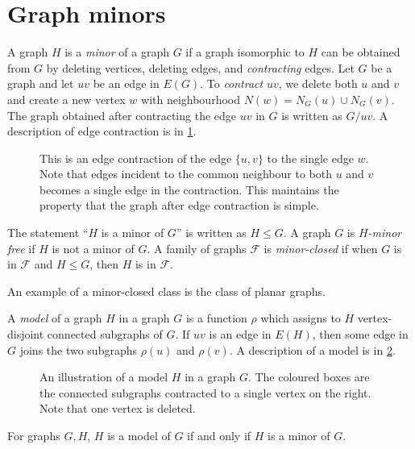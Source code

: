 \section{Graph minors}
A graph \(H\) is a \textit{minor} of a graph \(G\) if a graph isomorphic to \(H\) can be obtained from \(G\) by deleting vertices, deleting edges, and \textit{contracting} edges. Let $G$ be a graph and let $uv$ be an edge in $E(G)$. To \textit{contract} \(uv\), we delete both \(u\) and \(v\) and create a new vertex \(w\) with neighbourhood \(N(w) = N_G(u) \cup N_G(v)\). The graph obtained after contracting the edge \(uv\) in $G$ is written as \(G/uv\).
A description of edge contraction is in \cref{fig:edge_contraction}.
\begin{figure}[h!]
	\centering
	
	\caption[Edge contraction]{This is an edge contraction of the edge $\{u, v\}$ to the single edge $w$. Note that edges incident to the common neighbour to both $u$ and $v$ becomes a single edge in the contraction. This maintains the property that the graph after edge contraction is simple.}\label{fig:edge_contraction}
\end{figure}

The statement ``\(H\) is a minor of \(G\)'' is written as \(H \leq G\). A graph \(G\) is \textit{\(H\)-minor free} if $H$ is not a minor of $G$. A family of graphs \(\mathcal{F}\) is \textit{minor-closed} if when $G$ is in \(\mathcal{F}\) and \(H \leq G\), then $H$ is in \(\mathcal{F}\).

An example of a minor-closed class is the class of planar graphs.

A \textit{model} of a graph \(H\) in a graph \(G\) is a function $\rho$ which assigns to \(H\) vertex-disjoint connected subgraphs of \(G\). If $uv$ is an edge in \(E(H)\), then some edge in \(G\) joins the two subgraphs \(\rho(u)\) and \(\rho(v)\). A description of a model is in \cref{fig:model_of_P5}.
\begin{figure}[h!]
	\centering
	
	\caption[A model $H$ in a graph $G$.]{An illustration of a model $H$ in a graph $G$. The coloured boxes are the connected subgraphs contracted to a single vertex on the right. Note that one vertex is deleted.}\label{fig:model_of_P5}
\end{figure}

\begin{lemma}
	For graphs $G, H$, \(H\) is a model of \(G\) if and only if $H$ is a minor of $G$.
\end{lemma}

